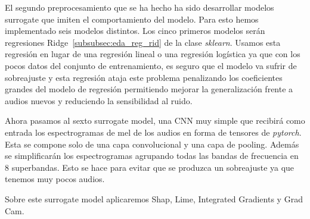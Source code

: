 El segundo preprocesamiento que se ha hecho ha sido desarrollar modelos surrogate que imiten el comportamiento del modelo. Para esto hemos implementado seis modelos distintos. Los cinco primeros modelos serán regresiones Ridge~\ref{subsubsec:eda_reg_rid} de la clase \textit{sklearn}. Usamos esta regresión en lugar de una regresión lineal o una regresión logística ya que con los pocos datos del conjunto de entrenamiento, es seguro que el modelo va sufrir de sobreajuste y esta regresión ataja este problema penalizando los coeficientes grandes del modelo de regresión permitiendo mejorar la generalización frente a audios nuevos y reduciendo la sensibilidad al ruido.

Ahora pasamos al sexto surrogate model, una CNN muy simple que recibirá como entrada los espectrogramas de mel de los audios en forma de tensores de \textit{pytorch}. Esta se compone solo de una capa convolucional y una capa de pooling. Además se simplificarán los espectrogramas agrupando todas las bandas de frecuencia en 8 superbandas. Esto se hace para evitar que se produzca un sobreajuste ya que tenemos muy pocos audios.

Sobre este surrogate model aplicaremos Shap, Lime, Integrated Gradients y Grad Cam.